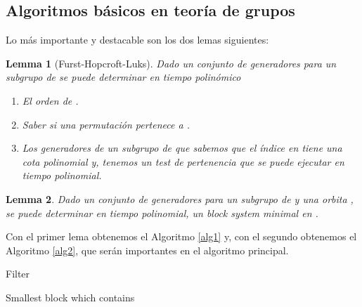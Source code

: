 \documentclass[12pt,a4paper]{book}
\theoremstyle{plain}
\newtheorem{lema}{Lemma}
\theoremstyle{definition}
\theoremstyle{remark}
\begin{document}
\begin{center}
\subsection*{Algoritmos básicos en teoría de grupos}
Lo más importante y destacable  son los dos lemas siguientes:

\begin{lema}[Furst-Hopcroft-Luks]
Dado un conjunto de generadores para un subgrupo  de  se puede determinar en tiempo polinómico
\begin{enumerate}
 \item El orden de .
 \item Saber si una permutación  pertenece a .
 \item Los generadores de un subgrupo de  que sabemos que el índice en  tiene una cota polinomial y,  tenemos un test de 
 pertenencia que se puede ejecutar en tiempo polinomial.
\end{enumerate}
\end{lema}

\begin{lema}
 Dado  un conjunto de generadores para un subgrupo  de  y una orbita , se puede determinar en tiempo polinomial, 
un block system minimal en . 
\end{lema}

Con el primer lema obtenemos el Algoritmo \ref{alg1} y,  con el segundo obtenemos el Algoritmo \ref{alg2}, que serán importantes en 
el algoritmo principal.

\begin{algorithm}\label{alg1}\hypertarget{alg1}{}
 
\KwData{}
\caption{Filter}

\end{algorithm}


\begin{algorithm}\label{alg2}\hypertarget{alg2}{}
\KwData{, }
\caption{Smallest block which contains }
\end{algorithm}


\end{center}
\end{document}
